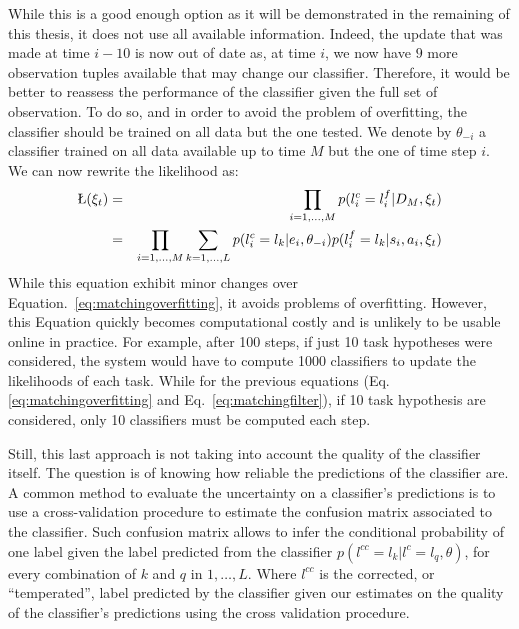 While this is a good enough option as it will be demonstrated in the remaining of this thesis, it does not use all available information. Indeed, the update that was made at time $i-10$ is now out of date as, at time $i$, we now have $9$ more observation tuples available that may change our classifier. Therefore, it would be better to reassess the performance of the classifier given the full set of observation. To do so, and in order to avoid the problem of overfitting, the classifier should be trained on all data but the one tested. We denote by $\theta_{-i}$ a classifier trained on all data available up to time $M$ but the one of time step $i$. We can now rewrite the likelihood as:
%
\begin{eqnarray}
\L(\xi_t) &=& \prod_{i = 1,\ldots,M} p(l^c_i = l^f_i | D_M, \xi_t) \nonumber \\ 
&=& \prod_{i = 1,\ldots,M} \sum_{k = 1, \ldots, L} p(l^c_i = l_k | e_i, \theta_{-i}) p(l^f_i = l_k | s_i, a_i, \xi_t) 
\label{eq:matching} 
\end{eqnarray}
%
While this equation exhibit minor changes over Equation.~\ref{eq:matchingoverfitting}, it avoids problems of overfitting. However, this Equation quickly becomes computational costly and is unlikely to be usable online in practice. For example, after 100 steps, if just 10 task hypotheses were considered, the system would have to compute 1000 classifiers to update the likelihoods of each task. While for the previous equations (Eq.\ref{eq:matchingoverfitting} and Eq.~\ref{eq:matchingfilter}), if 10 task hypothesis are considered, only 10 classifiers must be computed each step.

Still, this last approach is not taking into account the quality of the classifier itself. The question is of knowing how reliable the predictions of the classifier are. A common method to evaluate the uncertainty on a classifier's predictions is to use a cross-validation procedure to estimate the confusion matrix associated to the classifier. Such confusion matrix allows to infer the conditional probability of one label given the label predicted from the classifier $p(l^{cc} = l_k| l^c = l_q, \theta)$, for every combination of $k$ and $q$ in $1, \ldots, L$. Where $l^{cc}$ is the corrected, or ``temperated'', label predicted by the classifier given our estimates on the quality of the classifier's predictions using the cross validation procedure.

